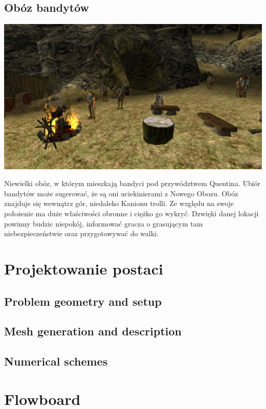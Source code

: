 \documentclass[11pt,polish, openany]{book}
\begin{document}
\section{Obóz bandytów}
\begin{center}
	\includegraphics[scale=0.25]{obozbandytow}
\end{center}
Niewielki obóz, w którym mieszkają bandyci pod przywództwem Quentina. Ubiór bandytów może sugerować, że są oni uciekinierami z Nowego Obozu. Obóz znajduje się wewnątrz gór, niedaleko Kanionu trolli. Ze względu na swoje położenie ma duże właściwości obronne i ciężko go wykryć.
Dzwięki danej lokacji powinny budzic niepokój, informować gracza o grasującym tam niebezpieczeństwie oraz 
przygotowywać do walki.





\chapter{Projektowanie postaci}\label{chapt:model}
\section{Problem geometry and setup}
\section{Mesh generation and description}
\section{Numerical schemes}

\chapter{Flowboard}\label{chapt:results}
\end{document}
